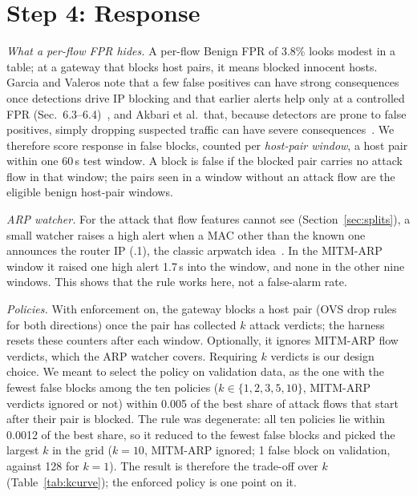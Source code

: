 \section{Step 4: Response}\label{sec:response}

\emph{What a per-flow FPR hides.} A per-flow Benign FPR of 3.8\% looks modest in a table; at a gateway that blocks host pairs, it means blocked innocent hosts. Garcia and Valeros note that a few false positives can have strong consequences once detections drive IP blocking and that earlier alerts help only at a controlled FPR (Sec.~6.3--6.4)~\cite{garcia2023labeling}, and Akbari et al.\ that, because detectors are prone to false positives, simply dropping suspected traffic can have severe consequences~\cite{akbari2020atmos}. We therefore score response in false blocks, counted per \emph{host-pair window}, a host pair within one 60\,s test window. A block is false if the blocked pair carries no attack flow in that window; the pairs seen in a window without an attack flow are the eligible benign host-pair windows.

\emph{ARP watcher.} For the attack that flow features cannot see (Section~\ref{sec:splits}), a small watcher raises a high alert when a MAC other than the known one announces the router IP (.1), the classic arpwatch idea~\cite{arpwatch}. In the MITM-ARP window it raised one high alert 1.7\,s into the window, and none in the other nine windows. This shows that the rule works here, not a false-alarm rate.

\emph{Policies.} With enforcement on, the gateway blocks a host pair (OVS drop rules for both directions) once the pair has collected $k$ attack verdicts; the harness resets these counters after each window. Optionally, it ignores MITM-ARP flow verdicts, which the ARP watcher covers. Requiring $k$ verdicts is our design choice. We meant to select the policy on validation data, as the one with the fewest false blocks among the ten policies ($k\in\{1,2,3,5,10\}$, MITM-ARP verdicts ignored or not) within 0.005 of the best share of attack flows that start after their pair is blocked. The rule was degenerate: all ten policies lie within 0.0012 of the best share, so it reduced to the fewest false blocks and picked the largest $k$ in the grid ($k=10$, MITM-ARP ignored; 1 false block on validation, against 128 for $k=1$). The result is therefore the trade-off over $k$ (Table~\ref{tab:kcurve}); the enforced policy is one point on it.

